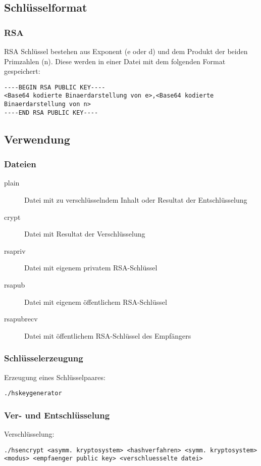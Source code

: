 \documentclass[11pt,a4paper,parskip=half]{scrartcl}
\begin{document}
\subsection{Schlüsselformat}
\subsubsection{RSA}
RSA Schlüssel bestehen aus Exponent (e oder d) und dem Produkt der beiden Primzahlen (n). Diese werden in einer Datei mit dem folgenden Format gespeichert:
\begin{lstlisting}
----BEGIN RSA PUBLIC KEY----
<Base64 kodierte Binaerdarstellung von e>,<Base64 kodierte Binaerdarstellung von n>
----END RSA PUBLIC KEY----
\end{lstlisting}

\subsection{Verwendung}
\subsubsection{Dateien}
\begin{description}
	\item[plain] Datei mit zu verschlüsselndem Inhalt oder Resultat der Entschlüsselung
	\item[crypt] Datei mit Resultat der Verschlüsselung
	\item[rsapriv] Datei mit eigenem privatem RSA-Schlüssel
	\item[rsapub] Datei mit eigenem öffentlichem RSA-Schlüssel
	\item[rsapubrecv] Datei mit öffentlichem RSA-Schlüssel des Empfängers
\end{description}

\subsubsection{Schlüsselerzeugung}
Erzeugung eines Schlüsselpaares:
\begin{lstlisting}
./hskeygenerator
\end{lstlisting}

\subsubsection{Ver- und Entschlüsselung}
Verschlüsselung:
\begin{lstlisting}
./hsencrypt <asymm. kryptosystem> <hashverfahren> <symm. kryptosystem> <modus> <empfaenger public key> <verschluesselte datei>
\end{lstlisting}
\end{document}
